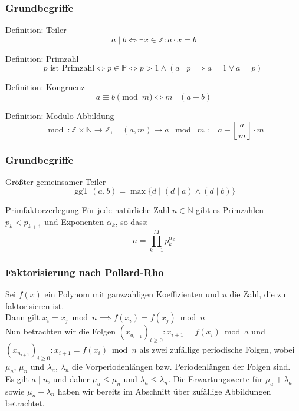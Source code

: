\documentclass{beamer}
\begin{document}
\begin{frame}
	\frametitle{Grundbegriffe}
	\begin{block}{Definition: Teiler}
		\[
			a \mid b \iff \exists x \in \mathbb Z: a \cdot x = b
		\]
	\end{block}
	\begin{block}{Definition: Primzahl}
		\[
			p \text{ ist Primzahl} \iff p \in \mathbb P \iff p>1 \wedge (a \mid p \implies a=1 \vee a=p) \
		\]
	\end{block}
	\begin{block}{Definition: Kongruenz}
		\[
			a \equiv b \pmod m \iff m \mid (a-b)
		\]
	\end{block}
	\begin{block}{Definition: Modulo-Abbildung}
		\[
			\bmod : \mathbb Z \times \mathbb N \to \mathbb Z,
			\quad (a,m) \mapsto a\;\bmod\;m:= a - \left \lfloor \frac{a}{m} \right \rfloor \cdot m
		\]
	\end{block}
\end{frame}


\begin{frame}
	\frametitle{Grundbegriffe}
	\begin{block}{Größter gemeinsamer Teiler}
		\[
			\operatorname{ggT}(a, b) = \max \{d \mid (d \mid a) \wedge (d \mid b) \}
		\]
	\end{block}
	\begin{block}{Primfaktorzerlegung}
		Für jede natürliche Zahl \(n \in \mathbb N \) gibt es Primzahlen \(p_k < p_{k+1}\) und Exponenten \(\alpha_k\), so dass:
		\[
			n=\prod_{k=1}^M p_k^{\alpha_k}
		\]
	\end{block}

\end{frame}


\begin{frame}
	\frametitle{Faktorisierung nach Pollard-Rho}
	Sei \(f(x)\) ein Polynom mit ganzzahligen Koeffizienten und \(n\) die Zahl, die zu faktorisieren ist.\\
	Dann gilt \( x_i = x_j \bmod n \implies f(x_i) = f(x_j)\bmod n\) \\
	Nun betrachten wir die Folgen \((x_{a_{i+1}})_{i \geq 0}: x_{i+1}=f(x_i) \bmod a\) und \((x_{n_{i+1}})_{i \geq 0}: x_{i+1}=f(x_i) \bmod n\)
	als zwei zufällige periodische Folgen, wobei \(\mu_a\), \(\mu_n\) und \(\lambda_a\), \(\lambda_n\)
	die Vorperiodenlängen bzw. Periodenlängen der Folgen sind. \\
	Es gilt \( a \mid n\), und daher \(\mu_a \leq \mu_n\) und \(\lambda_a \leq \lambda_n\).
	Die Erwartungswerte für \(\mu_a + \lambda_a\) sowie \(\mu_n + \lambda_n\)
	haben wir bereits im Abschnitt über zufällige Abbildungen betrachtet.
\end{frame}
\end{document}
